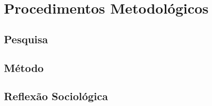 \chapter{Procedimentos Metodológicos}

\section{Pesquisa}

\section{Método}

\section{Reflexão Sociológica}
